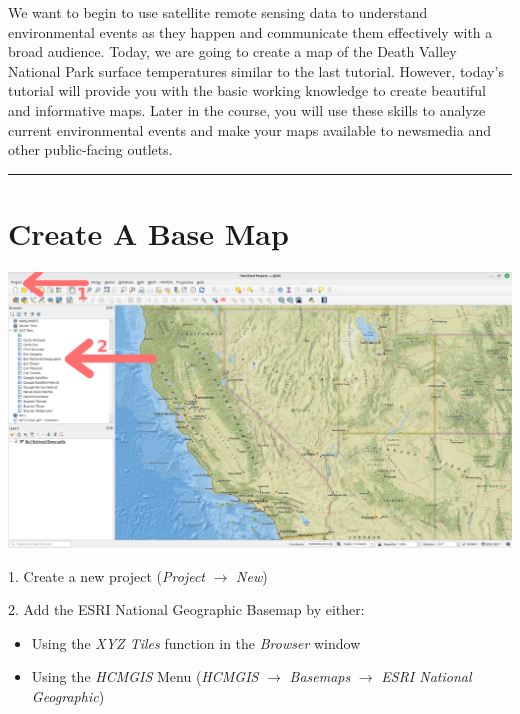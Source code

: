 \documentclass[oneside,a4paper,11pt,explicit]{book}
\begin{document}
\vspace{1 em}

We want to begin to use satellite remote sensing data to understand environmental events as they happen and communicate them effectively with a broad audience. Today, we are going to create a  map of the Death Valley National Park surface temperatures similar to the last tutorial. However, today's tutorial will provide you with the basic working knowledge to create beautiful and informative maps. Later in the course, you will use these skills to analyze current environmental events and make your maps available to newsmedia and other public-facing outlets. 

\vspace{1 em}

\hrule

\section{Create A Base Map}

\centerline{\includegraphics[width=\textwidth]{Basemap.png}}

1. Create a new project (\textit{Project} $\rightarrow$ \textit{New})

\begin{singlespace}
2. Add the ESRI National Geographic Basemap by either:
	\begin{itemize}
		\item Using the \textit{XYZ Tiles} function in the \textit{Browser} window
		\item Using the \textit{HCMGIS} Menu (\textit{HCMGIS} $\rightarrow$ \textit{Basemaps} $\rightarrow$ \textit{ESRI National Geographic})
	\end{itemize}
\end{singlespace}
\end{document}
